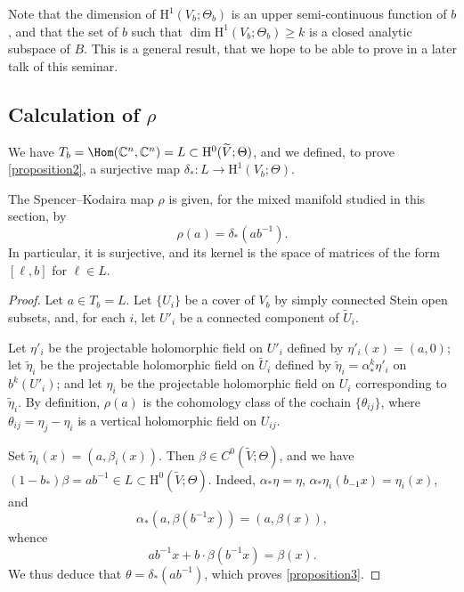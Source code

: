 \documentclass{article}
\theoremstyle{plain}
\newenvironment{proposition}[1]
    {\renewcommand\theinnercustomproposition{#1}\innercustomproposition}
    {\endinnercustomproposition}
\theoremstyle{definition}
\newcommand{\CC}{\mathbb{C}}
\newcommand{\HH}{\mathrm{H}}
\renewcommand{\geq}{\geqslant}
\newcommand{\oldpage}[1]{\marginpar{\footnotesize$\Big\vert$ \textit{p.~#1}}}
\begin{document}
Note that the dimension of $\HH^1(V_b;\Theta_b)$ is an upper semi-continuous function of $b$, and that the set of $b$ such that $\dim\HH^1(V_b;\Theta_b)\geq k$ is a closed analytic subspace of $B$.
This is a general result, that we hope to be able to prove in a later talk of this seminar.


\subsection{Calculation of \texorpdfstring{$\rho$}{p}}
\label{III.3}

We have $T_b=\Hom(\CC^n,\CC^n)=L\subset\HH^0(\widetilde{V};\Theta)$, and we defined, to prove \cref{proposition2}, a surjective map $\delta_*\colon L\to\HH^1(V_b;\Theta)$.

\begin{proposition}{3}
\label{proposition3}
  The Spencer--Kodaira map $\rho$ is given, for the mixed manifold studied in this section, by
  \[
    \rho(a) = \delta_*(ab^{-1}).
  \]
  In particular, it is surjective, and its kernel is the space of matrices of the form $[\ell,b]$ for $\ell\in L$.
\end{proposition}

\begin{proof}
  Let $a\in T_b=L$.
  Let $\{U_i\}$ be a cover of $V_b$ by simply connected Stein open subsets, and, for each $i$, let $U'_i$ be a connected component of $\widetilde{U}_i$.

  Let $\eta'_i$ be the projectable holomorphic field on $U'_i$ defined by $\eta'_i(x)=(a,0)$;
  let $\widetilde{\eta}_i$ be the projectable holomorphic field on $\widetilde{U
  }_i$ defined by $\widetilde{\eta}_i=\alpha_*^k\eta'_i$ on $b^k(U'_i)$;
  and let $\eta_i$ be the projectable holomorphic field on $U_i$ corresponding to $\widetilde{\eta}_i$.
  By definition, $\rho(a)$ is the cohomology class of the cochain $\{\theta_{ij}\}$, where $\theta_{ij}=\eta_j-\eta_i$ is a vertical holomorphic field on $U_{ij}$.

\oldpage{3-07}
  Set $\widetilde{\eta}_i(x)=(a,\beta_i(x))$.
  Then $\beta\in C^0(\widetilde{V};\Theta)$, and we have $(1-b_*)\beta=ab^{-1}\in L\subset\HH^0(\widetilde{V};\Theta)$.
  Indeed, $\alpha_*\eta=\eta$, $\alpha_*\eta_i(b_{-1}x)=\eta_i(x)$, and
  \[
    \alpha_*(a,\beta(b^{-1}x)) = (a,\beta(x)),
  \]
  whence
  \[
    ab^{-1}x + b\cdot\beta(b^{-1}x) = \beta(x).
  \]
  We thus deduce that $\theta=\delta_*(ab^{-1})$, which proves \cref{proposition3}.
\end{proof}
\end{document}
